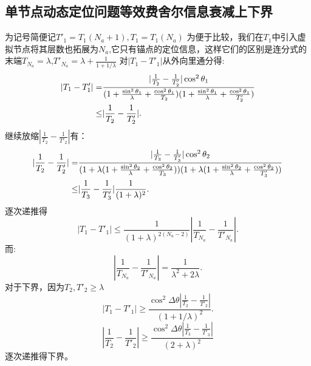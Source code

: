 
\subsection{单节点动态定位问题等效费舍尔信息衰减上下界}\label{B_F_2}
为记号简便记$T'_1=T_1(N_a+1),T_1=T_1(N_a)$
为便于比较，我们在$T_1$中引入虚拟节点将其层数也拓展为$N_a$,它只有锚点的定位信息，这样它们的区别是连分式的末端$T_{N_a}=\lambda$,$T'_{N_a}=\lambda+\frac{1}{1+1/\lambda}$
对$|T_1-T'_1|$从外向里通分得:
\begin{align}\notag
|T_1-T'_1|=&\frac{|\frac{1}{T_2}-\frac{1}{T'_2}|\cos^2\theta_1}{(1+\frac{\sin^2\theta_1}{\lambda}+\frac{\cos^2\theta_1}{T_2})
(1+\frac{\sin^2\theta_1}{\lambda}+\frac{\cos^2\theta_1}{T'_2})}\\
\leq &|\frac{1}{T_2}-\frac{1}{T'_2}|.
\end{align}
继续放缩$|\frac{1}{T_2}-\frac{1}{T'_2}|$有：
\begin{align}\notag
|\frac{1}{T_2}-\frac{1}{T'_2}|= & \frac{|\frac{1}{T_3}-\frac{1}{T'_3}|\cos^2\theta_2}{(1+\lambda(1+\frac{\sin^2\theta_2}{\lambda}+\frac{\cos^2\theta_2}{T_3}))
(1+\lambda(1+\frac{\sin^2\theta_2}{\lambda}+\frac{\cos^2\theta_2}{T'_3}))}\\
\leq & |\frac{1}{T_3}-\frac{1}{T'_3}|\frac{1}{(1+\lambda)^2}.
\end{align}
逐次递推得
\begin{equation}
|T_1-T'_1|\leq \frac{1}{(1+\lambda)^{2(N_a-2)}} |\frac{1}{T_{N_a}}-\frac{1}{T'_{N_a}}|.
\end{equation}
而:
\begin{equation}
|\frac{1}{T_{N_a}}-\frac{1}{T'_{N_a}}|=\frac{1}{\lambda^2+2\lambda}.
\end{equation}
对于下界，因为$T_2,T'_2\geq \lambda$
\begin{equation}
|T_1-T'_1|\geq \frac{\cos^2\Delta\theta|\frac{1}{T_2}-\frac{1}{T'_2}|}{(1+1/\lambda)^2}.
\end{equation}
\begin{equation}
|\frac{1}{T_2}-\frac{1}{T'_2}|\geq \frac{\cos^2\Delta\theta|\frac{1}{T_3}-\frac{1}{T'_3}|}{(2+\lambda)^2}
\end{equation}
逐次递推得下界。
